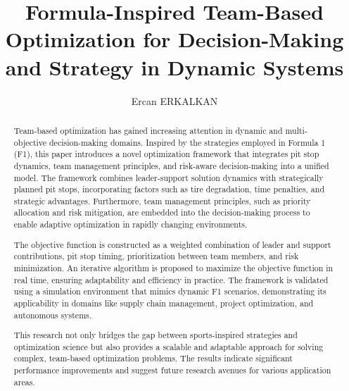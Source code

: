 \documentclass[preprint,12pt]{elsarticle}
\begin{document}
\begin{frontmatter}

\title{Formula-Inspired Team-Based Optimization for Decision-Making and Strategy in Dynamic Systems}

\author{Ercan ERKALKAN}

\begin{abstract}
Team-based optimization has gained increasing attention in dynamic and multi-objective decision-making domains. Inspired by the strategies employed in Formula 1 (F1), this paper introduces a novel optimization framework that integrates pit stop dynamics, team management principles, and risk-aware decision-making into a unified model. The framework combines leader-support solution dynamics with strategically planned pit stops, incorporating factors such as tire degradation, time penalties, and strategic advantages. Furthermore, team management principles, such as priority allocation and risk mitigation, are embedded into the decision-making process to enable adaptive optimization in rapidly changing environments.

The objective function is constructed as a weighted combination of leader and support contributions, pit stop timing, prioritization between team members, and risk minimization. An iterative algorithm is proposed to maximize the objective function in real time, ensuring adaptability and efficiency in practice. The framework is validated using a simulation environment that mimics dynamic F1 scenarios, demonstrating its applicability in domains like supply chain management, project optimization, and autonomous systems.

This research not only bridges the gap between sports-inspired strategies and optimization science but also provides a scalable and adaptable approach for solving complex, team-based optimization problems. The results indicate significant performance improvements and suggest future research avenues for various application areas.
\end{abstract}


\end{frontmatter}
\end{document}
